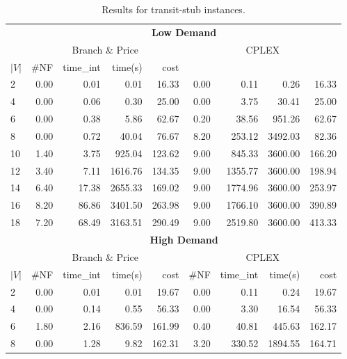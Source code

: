 \begin{table*}[h]
\small
\begin{center}
\caption{Results for transit-stub instances.}\label{tab:ts}
\begin{tabular} {l | r r r r | r r r r }
\hline
      &  \multicolumn{8}{c}{ \textbf{Low Demand} }                           \\
      &  \multicolumn{4}{c|}{Branch \& Price} & \multicolumn{4}{c}{CPLEX}    \\ 
$|V|$ & \#NF &  time\_int    &  time(s)       &  cost                         \\
\hline      
2&      0.00 & 0.01 & 0.01 & 16.33 & 0.00 & 0.11 & 0.26 & 16.33                \\  
4&      0.00 & 0.06 & 0.30 & 25.00 & 0.00 & 3.75 & 30.41 & 25.00               \\
6&      0.00 & 0.38 & 5.86 & 62.67 & 0.20 & 38.56 & 951.26 & 62.67             \\
8&      0.00 & 0.72 & 40.04 & 76.67 & 8.20 & 253.12 & 3492.03 & 82.36          \\
10&     1.40 & 3.75 & 925.04 & 123.62 & 9.00 & 845.33 & 3600.00 & 166.20       \\
12&     3.40 & 7.11 & 1616.76 & 134.35 & 9.00 & 1355.77 & 3600.00 & 198.94     \\
14&     6.40 & 17.38 & 2655.33 & 169.02 & 9.00 & 1774.96 & 3600.00 & 253.97    \\
16&     8.20 & 86.86 & 3401.50 & 263.98 & 9.00 & 1766.10 & 3600.00 & 390.89    \\
18&     7.20 & 68.49 & 3163.51 & 290.49 & 9.00 & 2519.80 & 3600.00 & 413.33    \\ 
\hline
       & \multicolumn{8}{c}{ \textbf{High Demand}} \\
       &       \multicolumn{4}{c|}{Branch \& Price} & \multicolumn{4}{c}{CPLEX}               \\  
$|V|$  & \#NF &  time\_int    &  time(s)       &  cost          &  \#NF &  time\_int  &  time(s)       &  cost \\
\hline      
2&       0.00 & 0.01 & 0.01 & 19.67 & 0.00 & 0.11 & 0.24 & 19.67                  \\  
4&       0.00 & 0.14 & 0.55 & 56.33 & 0.00 & 3.30 & 16.54 & 56.33                 \\
6&       1.80 & 2.16 & 836.59 & 161.99 & 0.40 & 40.81 & 445.63 & 162.17           \\
8&       0.00 & 1.28 & 9.82 & 162.31 & 3.20 & 330.52 & 1894.55 & 164.71           \\

\end{tabular}
\end{center}
\end{table*}
